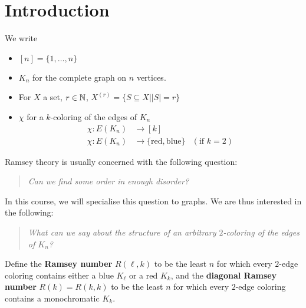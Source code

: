 \documentclass{article}
\begin{document}
\maketitle

\tableofcontents

\clearpage
\section{Introduction}

\newlec

\begin{notation}
  We write
  \begin{itemize}
    \item $[n] = \{1, \dots, n\}$
    \item $K_n$ for the complete graph on $n$ vertices.
    \item For $X$ a set, $r \in \mathbb N$, $X^{(r)} = \{S \subseteq X | |S| = r\}$
    \item $\chi$ for a $k$-coloring of the edges of $K_n$
      \begin{align*}
        \chi : E(K_n) & \to [k] \\
        \chi : E(K_n) & \to \{\text{red}, \text{blue}\} & (\text{if } k = 2)
      \end{align*}
  \end{itemize}
\end{notation}

Ramsey theory is usually concerned with the following question:

\begin{quotation}
  \textit{Can we find some order in enough disorder?}
\end{quotation}

In this course, we will specialise this question to graphs. We are thus interested in the following:

\begin{quotation}
  \textit{What can we say about the structure of an arbitrary $2$-coloring of the edges of $K_n$?}
\end{quotation}

\begin{dfn}
  Define the {\bf Ramsey number} $R(\ell, k)$ to be the least $n$ for which every $2$-edge coloring contains either a blue $K_\ell$ or a red $K_k$, and the {\bf diagonal Ramsey number} $R(k) = R(k, k)$ to be the least $n$ for which every $2$-edge coloring contains a monochromatic $K_k$.
\end{dfn}
\end{document}
